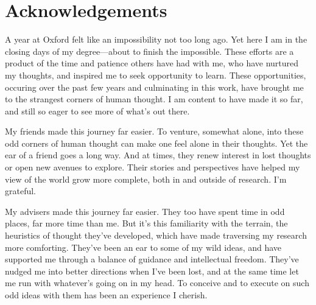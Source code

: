 \section*{\huge Acknowledgements}

A year at Oxford felt like an impossibility not too long ago. Yet here I am in the closing days of my degree---about to finish the impossible. These efforts are a product of the time and patience others have had with me, who have nurtured my thoughts, and inspired me to seek opportunity to learn. These opportunities, occuring over the past few years and culminating in this work, have brought me to the strangest corners of human thought. I am content to have made it so far, and still so eager to see more of what's out there.

My friends made this journey far easier. To venture, somewhat alone, into these odd corners of human thought can make one feel alone in their thoughts. Yet the ear of a friend goes a long way. And at times, they renew interest in lost thoughts or open new avenues to explore. Their stories and perspectives have helped my view of the world grow more complete, both in and outside of research. I'm grateful.

My advisers made this journey far easier. They too have spent time in odd places, far more time than me. But it's this familiarity with the terrain, the heuristics of thought they've developed, which have made traversing my research more comforting. They've been an ear to some of my wild ideas, and have supported me through a balance of guidance and intellectual freedom. They've nudged me into better directions when I've been lost, and at the same time let me run with whatever's going on in my head. To conceive and to execute on such odd ideas with them has been an experience I cherish.

